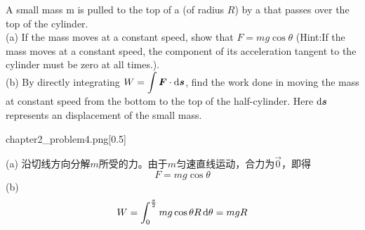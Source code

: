 \begin{solution}[质点动力学计算]
    A small mass m is pulled to the top of a   (of radius $R$) by a  that passes over the top of the cylinder.\\
	(a) If the mass moves at a constant speed, show that $F=mg\cos\theta$ (Hint:If the mass moves at a constant speed, the component of its acceleration tangent to the cylinder must be zero at all times.).\\
	(b) By directly integrating $\displaystyle W=\int \vec{F}\cdot \dif \vec{s}$, find the work done in moving the mass at constant speed from the bottom to the top of the half-cylinder. Here $\dif \vec{s}$ represents an  displacement of the small mass.
 
    \begin{singlefigure}[第五题图]{chapter2_problem4.png}[0.5]
	\end{singlefigure}
	
	\tcbrule
	
    (a) 沿切线方向分解$m$所受的力。由于$m$匀速直线运动，合力为$\vec{0}$，即得
    \[
    F=mg\cos\theta
    \]
    (b)
    \[
    W=\int_{0}^{\frac{\pi}{2}}mg\cos\theta R\dif \theta=mgR
    \]
\end{solution}